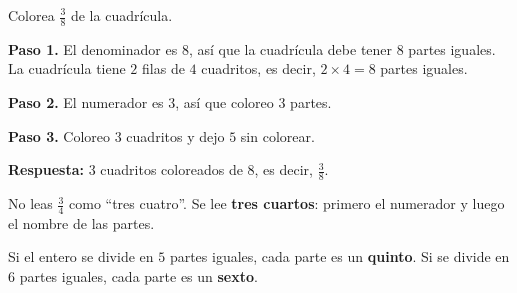 \begin{wbexample}
Colorea $\frac{3}{8}$ de la cuadrícula.

\begin{center}
\end{center}

\textbf{Paso 1.} El denominador es $8$, así que la cuadrícula debe tener $8$ partes iguales. La cuadrícula tiene $2$ filas de $4$ cuadritos, es decir, $2 \times 4 = 8$ partes iguales.

\textbf{Paso 2.} El numerador es $3$, así que coloreo $3$ partes.

\textbf{Paso 3.} Coloreo $3$ cuadritos y dejo $5$ sin colorear.

\begin{center}
\end{center}

\textbf{Respuesta:} $3$ cuadritos coloreados de $8$, es decir, $\frac{3}{8}$.
\end{wbexample}

\begin{wbtip}
No leas $\frac{3}{4}$ como ``tres cuatro''. Se lee \textbf{tres cuartos}: primero el numerador y luego el nombre de las partes.

Si el entero se divide en $5$ partes iguales, cada parte es un \textbf{quinto}. Si se divide en $6$ partes iguales, cada parte es un \textbf{sexto}.
\end{wbtip}

